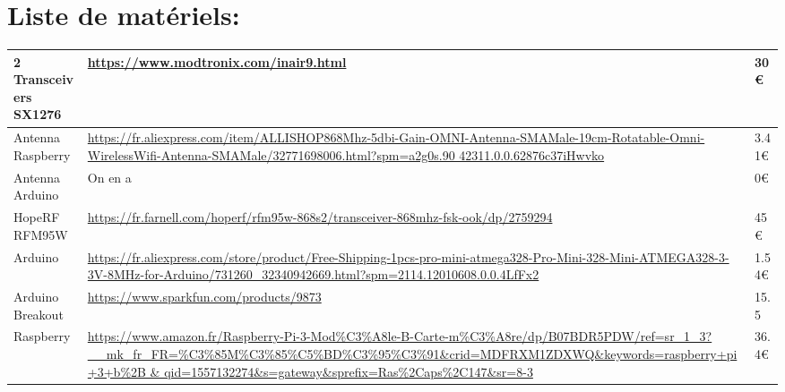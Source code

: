 \section*{Liste de matériels:}





\begin{table}[h!]
\scriptsize
	\begin{tabulary}{\textwidth}{L|L|L}
	2 Transceivers SX1276 & \url{https://www.modtronix.com/inair9.html}                                                                                                                                                & 30€ \\\hline        
	Antenna Raspberry     & \url{https://fr.aliexpress.com/item/ALLISHOP868Mhz-5dbi-Gain-OMNI-Antenna-SMAMale-19cm-Rotatable-Omni-WirelessWifi-Antenna-SMAMale/32771698006.html?spm=a2g0s.90 42311.0.0.62876c37iHwvko} & 3.41€  \\\hline     
	Antenna Arduino       & On en a                                                                                                                                                                              & 0€  \\\hline        
	HopeRF RFM95W         & \url{https://fr.farnell.com/hoperf/rfm95w-868s2/transceiver-868mhz-fsk-ook/dp/2759294}                                                                                                     & 45€  \\\hline       
	Arduino               & \url{https://fr.aliexpress.com/store/product/Free-Shipping-1pcs-pro-mini-atmega328-Pro-Mini-328-Mini-ATMEGA328-3-3V-8MHz-for-Arduino/731260_32340942669.html?spm=2114.12010608.0.0.4LfFx2} & 1.54€  \\\hline          
	Arduino Breakout      & \url{https://www.sparkfun.com/products/9873} & 15.5\\\hline       
	Raspberry             & \url{https://www.amazon.fr/Raspberry-Pi-3-Mod\%C3\%A8le-B-Carte-m\%C3\%A8re/dp/B07BDR5PDW/ref=sr_1_3?__mk_fr_FR=\%C3\%85M\%C3\%85\%C5\%BD\%C3\%95\%C3\%91\&crid=MDFRXM1ZDXWQ\&keywords=raspberry+pi+3+b\%2B & qid=1557132274\&s=gateway\&sprefix=Ras\%2Caps\%2C147\&sr=8-3} & 36.4€  \\\hline
	\end{tabulary}
\end{table}


